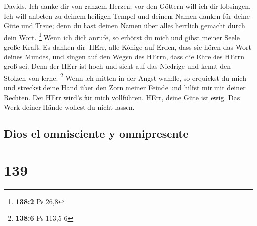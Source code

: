  Davids. Ich danke dir von ganzem Herzen; vor den Göttern
will ich dir lobsingen.  Ich will anbeten zu deinem
heiligen Tempel und deinem Namen danken für deine Güte und Treue; denn
du hast deinen Namen über alles herrlich gemacht durch dein Wort.
\footnote{\textbf{138:2} Ps 26,8}  Wenn ich dich anrufe,
so erhörst du mich und gibst meiner Seele große Kraft.  Es
danken dir, HErr, alle Könige auf Erden, dass sie hören das Wort deines
Mundes,  und singen auf den Wegen des HErrn, dass die Ehre
des HErrn groß sei.  Denn der HErr ist hoch und sieht auf
das Niedrige und kennt den Stolzen von ferne. \footnote{\textbf{138:6}
  Ps 113,5-6}  Wenn ich mitten in der Angst wandle, so
erquickst du mich und streckst deine Hand über den Zorn meiner Feinde
und hilfst mir mit deiner Rechten.  Der HErr wird's für
mich vollführen. HErr, deine Güte ist ewig. Das Werk deiner Hände
wollest du nicht lassen.

\hypertarget{dios-el-omnisciente-y-omnipresente}{%
\subsection{Dios el omnisciente y
omnipresente}\label{dios-el-omnisciente-y-omnipresente}}

\hypertarget{section-138}{%
\section{139}\label{section-138}}

